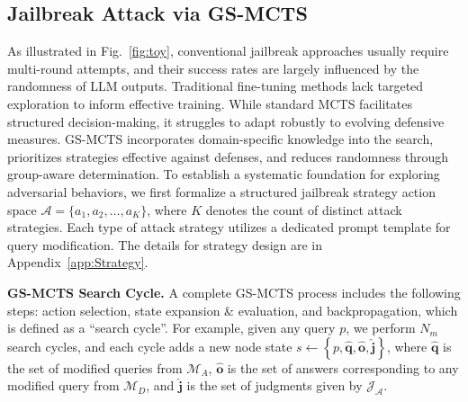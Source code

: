 \documentclass[11pt]{article}
\def\attackmethod{GS-MCTS}
\begin{document}
\subsection{Jailbreak Attack via {\attackmethod}}

As illustrated in Fig.~\ref{fig:toy}, conventional jailbreak approaches usually require multi-round attempts, and their success rates are largely influenced by the randomness of LLM outputs. Traditional fine-tuning methods lack targeted exploration to inform effective training. While standard MCTS facilitates structured decision-making, it struggles to adapt robustly to evolving defensive measures. {\attackmethod} incorporates domain-specific knowledge into the search, prioritizes strategies effective against defenses, and reduces randomness through group-aware determination. To establish a systematic foundation for exploring adversarial behaviors, we first formalize a structured jailbreak strategy action space $\mathcal{A}=\{a_1, a_2,\ldots, a_K\}$, where $K$ denotes the count of distinct attack strategies. Each type of attack strategy utilizes a dedicated prompt template for query modification. The details for strategy design are in Appendix~\ref{app:Strategy}.



\noindent\textbf{{\attackmethod} Search Cycle.} A complete {\attackmethod} process includes the following steps: action selection, state expansion \& evaluation, and backpropagation, which is defined as a ``search cycle''. For example, given any query $p$, we perform $N_{m}$ search cycles, and each cycle adds a new node state $s \gets \left\{p, \mathbf{\hat{q}}, \mathbf{\hat{o}}, \mathbf{\hat{j}}\right\}$, where $\mathbf{\hat{q}}$ is the set of modified queries from $\mathcal{M}_A$, $\mathbf{\hat{o}}$ is the set of answers corresponding to any modified query from $\mathcal{M}_D$, and $\mathbf{\hat{j}}$ is the set of judgments given by $\mathcal{J_{A}}$.
\end{document}
